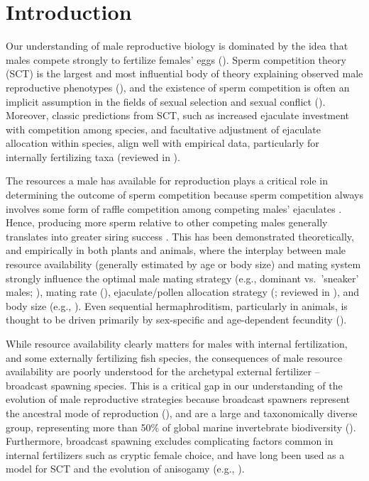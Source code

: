 \documentclass{article}
\begin{document}
\section*{Introduction}

Our understanding of male reproductive biology is dominated by the idea that males compete strongly to fertilize females' eggs (\citealt{Bateman1948, Parker1972, Parker1982}). Sperm competition theory (SCT) is the largest and most influential body of theory explaining observed male reproductive phenotypes (\citealt{Parker1972, Parker1982,Wedell2002}), and the existence of sperm competition is often an implicit assumption in the fields of sexual selection and sexual conflict (\citealt{BirkheadMoller1998,ArnqvistRowe2005}). Moreover, classic predictions from SCT, such as increased ejaculate investment with competition among species, and facultative adjustment of ejaculate allocation within species, align well with empirical data, particularly for internally fertilizing taxa (reviewed in \citealt{Wedell2002}). 

The resources a male has available for reproduction plays a critical role in determining the outcome of sperm competition because sperm competition always involves some form of raffle competition among competing males' ejaculates \citep{Wedell2002,ArnqvistRowe2005}. Hence, producing more sperm relative to other competing males generally translates into greater siring success \citep{Parker1972, Parker1982,Wedell2002}. This has been demonstrated theoretically, and empirically in both plants and animals, where the interplay between male resource availability (generally estimated by age or body size) and mating system strongly influence the optimal male mating strategy (e.g., dominant vs.~'sneaker' males; \citealt{Parker1990a,Parker1990b,GageEtAl1995}), mating rate (\citealt{Parker1990b,BirkheadMoller1998,Wedell2002}), ejaculate/pollen allocation strategy (\citealt{FriedmanBarrett2009}; reviewed in \citealt{Wedell2002,Zhang2006}), and body size (e.g., \citealt{ArnoldWade1984}). Even sequential hermaphroditism, particularly in animals, is thought to be driven primarily by sex-specific and age-dependent fecundity (\citealt{Ghiselin1969,Warner1975,Warner1988,MundayWarner2006}).

While resource availability clearly matters for males with internal fertilization, and some externally fertilizing fish species, the consequences of male resource availability are poorly understood for the archetypal external fertilizer -- broadcast spawning species. This is a critical gap in our understanding of the evolution of male reproductive strategies because broadcast spawners represent the ancestral mode of reproduction (\citealt{RouFitz1994}), and are a large and taxonomically diverse group, representing more than 50\% of global marine invertebrate biodiversity (\citealt{MonroMarshall2015}). Furthermore, broadcast spawning excludes complicating factors common in internal fertilizers such as cryptic female choice, and have long been used as a model for SCT and the evolution of anisogamy (e.g., \citealt{Parker1972, Parker1982}). 
\end{document}
